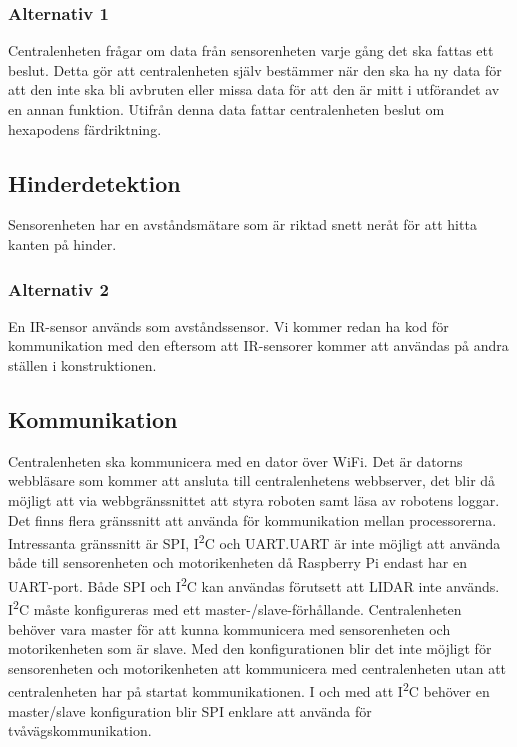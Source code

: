 \documentclass[a4paper,titlepage,12pt]{article}
\newcommand{\itc}{I\textsuperscript{2}C}
\begin{document}
	\subsubsection{Alternativ 1}
	Centralenheten frågar om data från sensorenheten varje gång det ska fattas ett
	beslut. Detta gör att centralenheten själv bestämmer när den ska ha ny data
	för att den inte ska bli avbruten eller missa data för att den är mitt i
	utförandet av en annan funktion. Utifrån denna data fattar centralenheten
	beslut om hexapodens färdriktning.

	\subsection{Hinderdetektion}
	Sensorenheten har en avståndsmätare som är riktad snett neråt för att hitta kanten 
	på hinder.

	\subsubsection{Alternativ 2}
	En IR-sensor används som avståndssensor. Vi kommer redan ha  kod för kommunikation med
	den  eftersom att IR-sensorer kommer att användas på andra ställen i konstruktionen. 
	
	\subsection{Kommunikation}
	Centralenheten ska kommunicera med en dator över WiFi. Det är datorns webbläsare 
	som kommer att ansluta till centralenhetens webbserver, det blir då möjligt att
	via webbgränssnittet att styra roboten samt läsa av robotens loggar. Det finns
	flera gränssnitt att 
	använda för kommunikation mellan processorerna. Intressanta gränssnitt är SPI, 
	\itc{} och UART.\@ UART är inte möjligt att använda både till sensorenheten och 
	motorikenheten då Raspberry Pi endast har en UART-port. Både 
	SPI och \itc{} kan användas förutsett att LIDAR inte används. \itc{} måste konfigureras med ett
	master-/slave-förhållande. Centralenheten behöver vara master för att kunna
	kommunicera med 
	sensorenheten och motorikenheten som är slave. Med den konfigurationen blir 
	det inte möjligt för sensorenheten och motorikenheten att kommunicera med
	centralenheten utan att centralenheten har på startat kommunikationen. I och 
	med att \itc{} behöver en master/slave konfiguration blir SPI enklare att använda 
	för tvåvägskommunikation.
	
\end{document}

